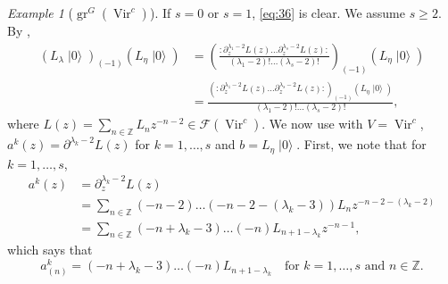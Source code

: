 \documentclass[a4paper, 12pt, reqno]{amsart}
\theoremstyle{remark}
\newtheorem{example}[theorem]{Example}
\numberwithin{equation}{subsection}
\DeclareMathOperator{\Vir}{Vir}
\DeclareMathOperator{\gr}{gr}
\DeclareMathOperator{\vac}{|0\rangle}
\begin{document}
\begin{example}[$\gr^G(\Vir^c)$]
  If $s = 0$ or $s = 1$, \eqref{eq:36} is clear.
  We assume $s \ge 2$.
  By ,
  \begin{align*}
    (L_{\lambda}\vac)_{(-1)}(L_{\eta}\vac) &= \left(\frac{:\partial_z^{\lambda_1 - 2}L(z)\dots\partial_z^{\lambda_s - 2}L(z):}{(\lambda_1 - 2)!\dots(\lambda_s - 2)!} \right)_{(-1)}(L_{\eta}\vac) \\
    &= \frac{(:\partial_z^{\lambda_1 - 2}L(z)\dots\partial_z^{\lambda_s - 2}L(z):)_{(-1)}(L_{\eta}\vac)}{(\lambda_1 - 2)!\dots(\lambda_s - 2)!},
  \end{align*}
  where $L(z) = \sum_{n \in \mathbb{Z}}L_nz^{-n - 2} \in \mathcal{F}(\Vir^c)$.
  We now use  with $V = \Vir^c$, $a^k(z) = \partial^{\lambda_k - 2}L(z)$ for $k = 1, \dots, s$ and $b = L_{\eta}\vac$.
  First, we note that for $k = 1, \dots, s$,
  \begin{align*}
    a^k(z) &= \partial_z^{\lambda_k - 2}L(z) \\
    &= \sum_{n \in \mathbb{Z}}(-n - 2)\dots(-n - 2 - (\lambda_k - 3))L_nz^{-n - 2 - (\lambda_k - 2)} \\
    &= \sum_{n \in \mathbb{Z}}(-n + \lambda_k - 3)\dots(-n)L_{n + 1 - \lambda_k}z^{-n - 1},
  \end{align*}
  which says that
  \begin{equation*}
    a^k_{(n)} = (-n + \lambda_k - 3)\dots(-n)L_{n + 1 - \lambda_k} \quad \text{for }k = 1, \dots, s\text{ and }n \in \mathbb{Z}.
  \end{equation*}


\end{example}
\end{document}
